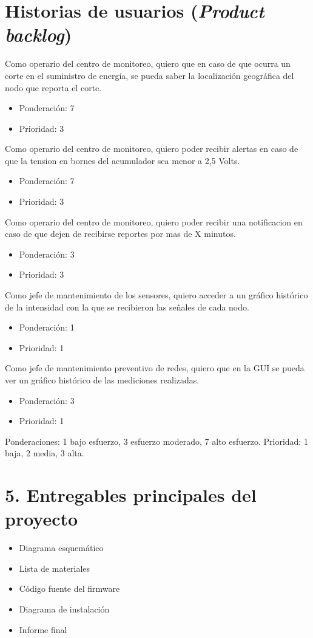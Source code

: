 \documentclass[11pt]{charter}
\begin{document}
\section{Historias de usuarios (\textit{Product backlog})}
\label{sec:backlog}
Como operario del centro de monitoreo, quiero que en caso de que ocurra un corte en el suministro de energía, se pueda saber la localización geográfica del nodo que reporta el corte.
\begin{itemize}
	\item Ponderación: 7
	\item Prioridad: 3
\end{itemize}

Como operario del centro de monitoreo, quiero poder recibir alertas en caso de que la tension en bornes del acumulador sea menor a 2,5 Volts.
\begin{itemize}
	\item Ponderación: 7
	\item Prioridad: 3
\end{itemize}

Como operario del centro de monitoreo, quiero poder recibir una notificacion en caso de que dejen de recibirse reportes por mas de X minutos.
\begin{itemize}
	\item Ponderación: 3
	\item Prioridad: 3
\end{itemize}

Como jefe de mantenimiento de los sensores, quiero acceder a un gráfico histórico de la intensidad con la que se recibieron las señales de cada nodo.
\begin{itemize}
	\item Ponderación: 1
	\item Prioridad: 1
\end{itemize}

Como jefe de mantenimiento preventivo de redes, quiero que en la GUI se pueda ver un gráfico histórico de las mediciones realizadas.
\begin{itemize}
	\item Ponderación: 3
	\item Prioridad: 1
\end{itemize}

Ponderaciones: 1 bajo esfuerzo, 3 esfuerzo moderado, 7 alto esfuerzo.
Prioridad: 1 baja, 2 media, 3 alta.

\section{5. Entregables principales del proyecto}
\label{sec:entregables}
\begin{itemize}
\item Diagrama esquemático
\item Lista de materiales
\item Código fuente del firmware
\item Diagrama de instalación
\item Informe final
\end{itemize}
\end{document}
